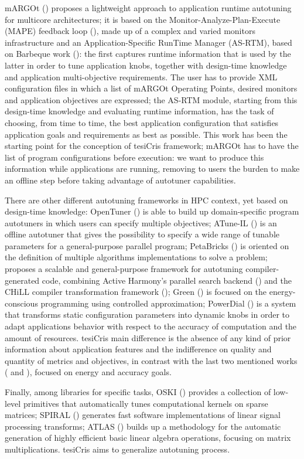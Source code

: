 mARGOt (\cite{gadioli2015application}) proposes a lightweight approach to application runtime autotuning for multicore architectures; it is based on the Monitor-Analyze-Plan-Execute (MAPE) feedback loop (\cite{kephart2003vision}), made up of a complex and varied monitors infrastructure and an Application-Specific RunTime Manager (AS-RTM), based on Barbeque work (\cite{bellasi2012rtrm}): the first captures runtime information that is used by the latter in order to tune application knobs, together with design-time knowledge and application multi-objective requirements. The user has to provide XML configuration files in which a list of mARGOt Operating Points, desired monitors and application objectives are expressed; the AS-RTM module, starting from this design-time knowledge and evaluating runtime information, has the task of choosing, from time to time, the best application configuration that satisfies application goals and requirements as best as possible. This work has been the starting point for the conception of tesiCris framework; mARGOt has to have the list of program configurations before execution: we want to produce this information while applications are running, removing to users the burden to make an offline step before taking advantage of autotuner capabilities.

There are other different autotuning frameworks in HPC context, yet based on design-time knowledge: OpenTuner (\cite{ansel2014opentuner}) is able to build up domain-specific program autotuners in which users can specify multiple objectives; ATune-IL (\cite{schaefer2009atune}) is an offline autotuner that gives the possibility to specify a wide range of tunable parameters for a general-purpose parallel program; PetaBricks (\cite{ansel2009petabricks}) is oriented on the definition of multiple algorithms implementations to solve a problem; \cite{tiwari2009scalable} proposes a scalable and general-purpose framework for autotuning compiler-generated code, combining Active Harmony's parallel search backend (\cite{chung2004using}) and the CHiLL compiler transformation framework (\cite{chen2008chill}); Green (\cite{baek2010green}) is focused on the energy-conscious programming using controlled approximation; PowerDial (\cite{hoffmann2011dynamic}) is a system that transforms static configuration parameters into dynamic knobs in order to adapt applications behavior with respect to the accuracy of computation and the amount of resources. tesiCris main difference is the absence of any kind of prior information about application features and the indifference on quality and quantity of metrics and objectives, in contrast with the last two mentioned works (\cite{baek2010green} and \cite{hoffmann2011dynamic}), focused on energy and accuracy goals.

Finally, among libraries for specific tasks, OSKI (\cite{vuduc2005oski}) provides a collection of low-level primitives that automatically tunes computational kernels on sparse matrices; SPIRAL (\cite{puschel2004spiral}) generates fast software implementations of linear signal processing transforms; ATLAS (\cite{whaley1998automatically}) builds up a methodology for the automatic generation of highly efficient basic linear algebra operations, focusing on matrix multiplications. tesiCris aims to generalize autotuning process.
